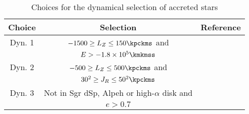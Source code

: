 \begin{table}
\centering
\caption{Choices for the dynamical selection of accreted stars}
\label{tab:dynamical_choices}
\begin{tabular}{ccc}
\hline \hline
Choice		&	Selection 							& Reference 				\\
\hline
Dyn. 1		&	$-1500 \geq L_Z \leq 150\kpckms$ and	&	\citet{Helmi2018}		\\
			&	$ E > -1.8 \times 10^5 \kmkmss$ 		&						\\
\hline
Dyn. 2		&	$-500 \geq L_Z \leq 500\kpckms$ and	&	\citet{Feuillet2020} 		\\
			&	$30^2 \geq J_R \leq 50^2 \kpckms$		&						\\
\hline
Dyn. 3		&	Not in Sgr dSp, Alpeh or high-$\alpha$ disk and &	\citet{Naidu2020}	\\
			&	$e > 0.7$							&					 \\
   \hline
\end{tabular}
\end{table}

